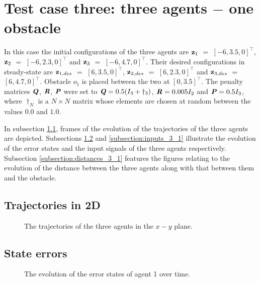 \section{Test case three: three agents $-$ one obstacle}

In this case the initial configurations of the three agents are
$\bm{\mathbf{z}}_1$ $=$ $[-6, 3.5, 0]^{\top}$,
$\bm{\mathbf{z}}_2$ $=$ $[-6, 2.3, 0]^{\top}$ and
$\bm{\mathbf{z}}_3$ $=$ $[-6, 4.7, 0]^{\top}$.
Their desired configurations in steady-state are
$\bm{\mathbf{z}}_{1,des}$ $=$ $[6, 3.5, 0]^{\top}$,
$\bm{\mathbf{z}}_{2,des}$ $=$ $[6, 2.3, 0]^{\top}$ and
$\bm{\mathbf{z}}_{3,des}$ $=$ $[6, 4.7, 0]^{\top}$.
Obstacle $o_1$ is placed between the two at $[0, 3.5]^{\top}$. The penalty
matrices $\bm{\mathit{Q}}$, $\bm{\mathit{R}}$, $\bm{\mathit{P}}$ were set to
$\bm{\mathit{Q}} = 0.5 (I_3 + \dagger_3)$, $\bm{\mathit{R}} = 0.005 I_2$ and
$\bm{\mathit{P}} = 0.5 I_3$, where $\dagger_N$ is a $N \times N$ matrix whose
elements are chosen at random between the values $0.0$ and $1.0$.

In subsection \ref{subsection:trajectories_3_1}, frames of the evolution of the
trajectories of the three agents are depicted. Subsections
\ref{subsection:errors_3_1} and \ref{subsection:inputs_3_1} illustrate
the evolution of the error states and the input signals of the three agents
respectively. Subsection \ref{subsection:distances_3_1} features the
figures relating to the evolution of the distance between the three agents
along with that between them and the obstacle.


\subsection{Trajectories in 2D}
\label{subsection:trajectories_3_1}

\begin{figure}[H]
  
  \caption{The trajectories of the three agents in the $x-y$ plane.}
  \label{fig:d_OFF_trajectory_3_1}
\end{figure}


\subsection{State errors}
\label{subsection:errors_3_1}

\begin{figure}[H]\centering
  \scalebox{0.7}{}
  \caption{The evolution of the error states of agent 1 over time.}
  \label{fig:d_OFF_3_1_errors_agent_1}
\end{figure}

